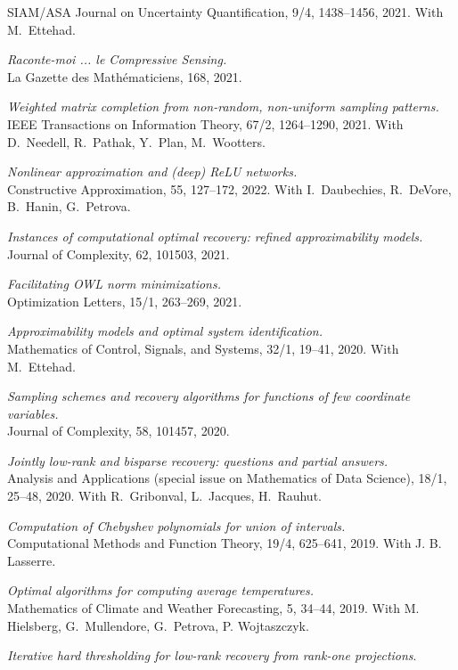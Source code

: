 \documentclass[11pt]{article}
\begin{document}
SIAM/ASA Journal on Uncertainty Quantification, 9/4, 1438--1456, 2021. 
With M.~Ettehad.
\item {\sl Raconte-moi ... le Compressive Sensing.}\\
La Gazette des Math\'ematiciens, 168, 2021. 
\item {\sl Weighted matrix completion from non-random, non-uniform sampling patterns.}\\
IEEE Transactions on Information Theory, 67/2, 1264--1290, 2021.
With D.~Needell, R.~Pathak, Y.~Plan, \mbox{M.~Wootters}.
\item {\sl Nonlinear approximation and (deep) ReLU networks.}\\
Constructive Approximation,  55, 127--172, 2022.
With I.~Daubechies, R.~DeVore, B.~Hanin, G.~Petrova.
\item {\sl Instances of computational optimal recovery: refined approximability models.}\\
Journal of Complexity, 62, 101503, 2021.
\item {\sl Facilitating OWL norm minimizations.}\\
Optimization Letters, 15/1, 263--269, 2021.
\item {\sl Approximability models and optimal system identification.}\\
Mathematics of Control, Signals, and Systems, 32/1, 19--41, 2020.
With M.~Ettehad.
\item {\sl Sampling schemes and recovery algorithms for functions of few coordinate variables.}\\
Journal of Complexity, 58, 101457, 2020.
\item {\sl Jointly low-rank and bisparse recovery: questions and partial answers.}\\
Analysis and Applications (special issue on Mathematics of Data Science), 18/1, 25--48, 2020.
With R.~Gribonval, L.~Jacques, H.~Rauhut.
\item {\sl Computation of Chebyshev polynomials for union of intervals.}\\
Computational Methods and Function Theory, 19/4, 625--641, 2019.
With J. B. Lasserre.
\item {\sl Optimal algorithms for computing average temperatures.}\\
Mathematics of Climate and Weather Forecasting, 5, 34--44, 2019.
With M. Hielsberg, G.~Mullendore, G.~Petrova, P. Wojtaszczyk.
\item {\sl Iterative hard thresholding for low-rank recovery from rank-one projections}.\\
\end{document}
